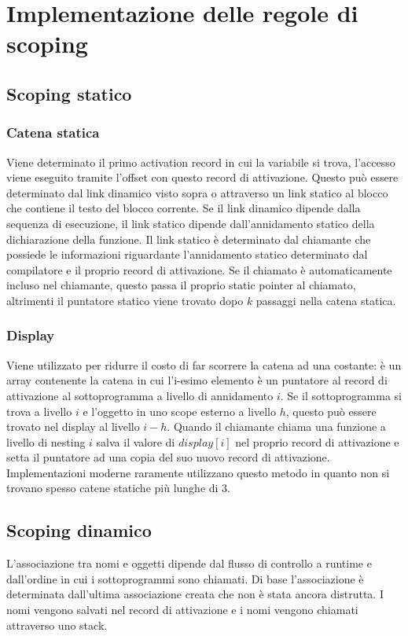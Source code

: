 \section{Implementazione delle regole di scoping}
\subsection{Scoping statico}
\subsubsection{Catena statica}
Viene determinato il primo activation record in cui la variabile si trova, l'accesso viene eseguito tramite l'offset con questo record di attivazione. Questo pu\`o essere
determinato dal link dinamico visto sopra o attraverso un link statico al blocco che contiene il testo del blocco corrente. Se il link dinamico dipende dalla sequenza di 
esecuzione, il link statico dipende dall'annidamento statico della dichiarazione della funzione. Il link statico \`e determinato dal chiamante che possiede le informazioni
riguardante l'annidamento statico determinato dal compilatore e il proprio record di attivazione. Se il chiamato \`e automaticamente incluso nel chiamante, questo passa il 
proprio static pointer al chiamato, altrimenti il puntatore statico viene trovato dopo $k$ passaggi nella catena statica.
\subsubsection{Display}
Viene utilizzato per ridurre il costo di far scorrere la catena ad una costante: \`e un array contenente la catena in cui l'i-esimo elemento \`e un puntatore al record di
attivazione al sottoprogramma a livello di annidamento $i$. Se il sottoprogramma si trova a livello $i$ e l'oggetto in uno scope esterno a livello $h$, questo pu\`o essere
trovato nel display al livello $i-h$. Quando il chiamante chiama una funzione a livello di nesting $i$ salva il valore di $display[i]$ nel proprio record di attivazione e setta
il puntatore ad una copia del suo nuovo record di attivazione. Implementazioni moderne raramente utilizzano questo metodo in quanto non si trovano spesso catene statiche pi\`u 
lunghe di $3$. 
\subsection{Scoping dinamico}
L'associazione tra nomi e oggetti dipende dal flusso di controllo a runtime e dall'ordine in cui i sottoprogrammi sono chiamati. Di base l'associazione \`e determinata 
dall'ultima associazione creata che non \`e stata ancora distrutta. I nomi vengono salvati nel record di attivazione e i nomi vengono chiamati attraverso uno stack. 
